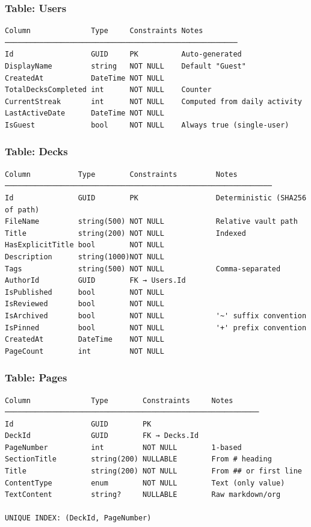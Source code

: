 \documentclass[14pt]{article}
\begin{document}
\subsubsection{Table: Users}
\label{sec:org9f3e989}
\begin{verbatim}
Column              Type     Constraints Notes
──────────────────────────────────────────────────────
Id                  GUID     PK          Auto-generated
DisplayName         string   NOT NULL    Default "Guest"
CreatedAt           DateTime NOT NULL
TotalDecksCompleted int      NOT NULL    Counter
CurrentStreak       int      NOT NULL    Computed from daily activity
LastActiveDate      DateTime NOT NULL
IsGuest             bool     NOT NULL    Always true (single-user)
\end{verbatim}

\newpage
\subsubsection{Table: Decks}
\label{sec:orgfb86d5d}
\begin{verbatim}
Column           Type        Constraints         Notes
──────────────────────────────────────────────────────────────
Id               GUID        PK                  Deterministic (SHA256 of path)
FileName         string(500) NOT NULL            Relative vault path
Title            string(200) NOT NULL            Indexed
HasExplicitTitle bool        NOT NULL
Description      string(1000)NOT NULL
Tags             string(500) NOT NULL            Comma-separated
AuthorId         GUID        FK → Users.Id
IsPublished      bool        NOT NULL
IsReviewed       bool        NOT NULL
IsArchived       bool        NOT NULL            '~' suffix convention
IsPinned         bool        NOT NULL            '+' prefix convention
CreatedAt        DateTime    NOT NULL
PageCount        int         NOT NULL
\end{verbatim}
\subsubsection{Table: Pages}
\label{sec:org45ec49e}
\begin{verbatim}
Column              Type        Constraints     Notes
───────────────────────────────────────────────────────────
Id                  GUID        PK
DeckId              GUID        FK → Decks.Id
PageNumber          int         NOT NULL        1-based
SectionTitle        string(200) NULLABLE        From # heading
Title               string(200) NOT NULL        From ## or first line
ContentType         enum        NOT NULL        Text (only value)
TextContent         string?     NULLABLE        Raw markdown/org

UNIQUE INDEX: (DeckId, PageNumber)
\end{verbatim}
\end{document}
